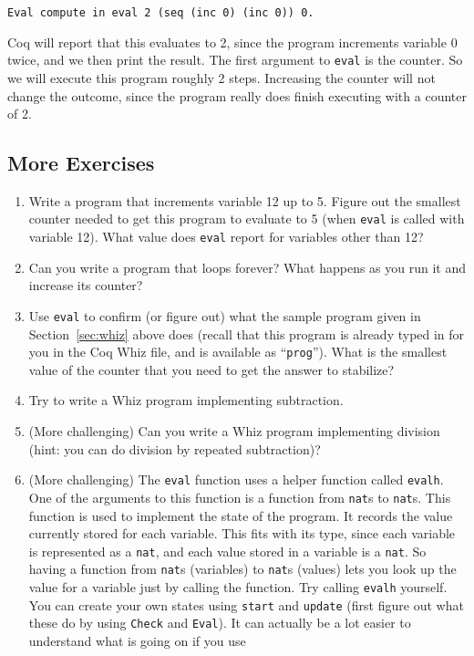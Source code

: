 \documentclass{book}[12pt]
\begin{document}
\begin{verbatim}
Eval compute in eval 2 (seq (inc 0) (inc 0)) 0.
\end{verbatim}

\noindent Coq will report that this evaluates to 2, since the program
increments variable $0$ twice, and we then print the result.  The
first argument to \texttt{eval} is the counter.  So we will execute
this program roughly 2 steps.  Increasing the counter will not change
the outcome, since the program really does finish executing with a
counter of 2.  

\subsection{More Exercises}

\begin{enumerate}
\item Write a program that increments variable 12 up to 5.  Figure out
the smallest counter needed to get this program to evaluate to 5 (when
\texttt{eval} is called with variable 12).  What value does \texttt{eval}
report for variables other than 12?

\item Can you write a program that loops forever?  What happens as
you run it and increase its counter?

\item Use \texttt{eval} to confirm (or figure out) what the sample
program given in Section~\ref{sec:whiz} above does (recall that this
program is already typed in for you in the Coq Whiz file, and is
available as ``\texttt{prog}'').  What is the smallest value of the
counter that you need to get the answer to stabilize?

\item Try to write a Whiz program implementing subtraction.

\item (More challenging) Can you write a Whiz program implementing
division (hint: you can do division by repeated subtraction)?

\item (More challenging) The \texttt{eval} function uses a helper
function called \texttt{evalh}.  One of the arguments to this function
is a function from \texttt{nat}s to \texttt{nat}s.  This function is
used to implement the state of the program.  It records the value
currently stored for each variable.  This fits with its type, since
each variable is represented as a \texttt{nat}, and each value stored
in a variable is a \texttt{nat}.  So having a function from
\texttt{nat}s (variables) to \texttt{nat}s (values) lets you look up
the value for a variable just by calling the function.  Try calling
\texttt{evalh} yourself.  You can create your own states using
\texttt{start} and \texttt{update} (first figure out what these do by
using \texttt{Check} and \texttt{Eval}).  It can actually be a lot
easier to understand what is going on if you use


\end{enumerate}
\end{document}
